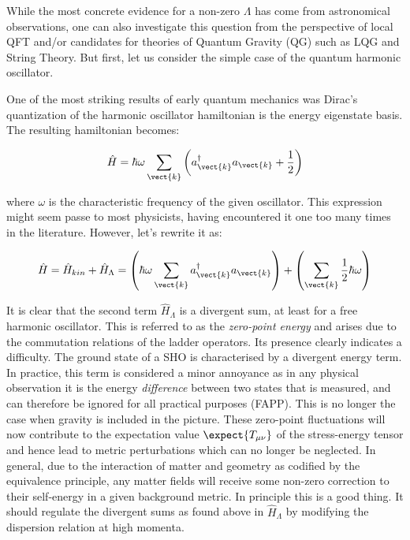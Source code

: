 \documentclass[11pt,english,rmp]{revtex4}
\begin{document}
While the most concrete evidence for a non-zero $\Lambda$ has come
from astronomical observations, one can also investigate this question
from the perspective of local QFT and/or candidates for theories of
Quantum Gravity (QG) such as LQG and String Theory. But first, let
us consider the simple case of the quantum harmonic oscillator.

One of the most striking results of early quantum mechanics was Dirac's
quantization of the harmonic oscillator hamiltonian is the energy
eigenstate basis. The resulting hamiltonian becomes:

\begin{equation}
\hat{H}=\hbar\omega\sum_{\vect{k}}\left(a_{\vect{k}}^{\dagger}a_{\vect{k}}+\frac{1}{2}\right)\end{equation}


where $\omega$ is the characteristic frequency of the given oscillator.
This expression might seem passe to most physicists, having encountered
it one too many times in the literature. However, let's rewrite it
as:

\begin{equation}
\hat{H}=\hat{H}_{kin}+\hat{H}_{\Lambda}=\left(\hbar\omega\sum_{\vect{k}}a_{\vect{k}}^{\dagger}a_{\vect{k}}\right)+\left(\sum_{\vect{k}}\frac{1}{2}\hbar\omega\right)\end{equation}


It is clear that the second term $\hat{H}_{\Lambda}$ is a divergent
sum, at least for a free harmonic oscillator. This is referred to
as the \emph{zero-point energy} and arises due to the commutation
relations of the ladder operators. Its presence clearly indicates
a difficulty. The ground state of a SHO is characterised by a divergent
energy term. In practice, this term is considered a minor annoyance
as in any physical observation it is the energy \emph{difference}
between two states that is measured, and can therefore be ignored
for all practical purposes (FAPP). This is no longer the case when
gravity is included in the picture. These \textquotedbl{}zero-point\textquotedbl{}
fluctuations will now contribute to the expectation value $\expect{T_{\mu\nu}}$
of the stress-energy tensor and hence lead to metric perturbations
which can no longer be neglected. In general, due to the interaction
of matter and geometry as codified by the equivalence principle, any
matter fields will receive some non-zero correction to their self-energy
in a given background metric. In principle this is a good thing. It
should regulate the divergent sums as found above in $\hat{H}_{\Lambda}$
by modifying the dispersion relation at high momenta.
\end{document}
